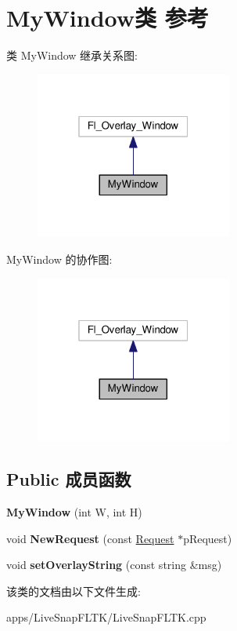 \hypertarget{class_my_window}{\section{My\+Window类 参考}
\label{class_my_window}
}


类 My\+Window 继承关系图\+:
\nopagebreak
\begin{figure}[H]
\begin{center}
\leavevmode
\includegraphics[width=184pt]{class_my_window__inherit__graph}
\end{center}
\end{figure}


My\+Window 的协作图\+:
\nopagebreak
\begin{figure}[H]
\begin{center}
\leavevmode
\includegraphics[width=184pt]{class_my_window__coll__graph}
\end{center}
\end{figure}
\subsection*{Public 成员函数}
\begin{DoxyCompactItemize}
\item 
\hypertarget{class_my_window_af4b59440a4d2df2c39d06c060c13b8ec}{{\bfseries My\+Window} (int W, int H)}\label{class_my_window_af4b59440a4d2df2c39d06c060c13b8ec}

\item 
\hypertarget{class_my_window_a23ed2568039530730f4863106d096101}{void {\bfseries New\+Request} (const \hyperlink{classmv_i_m_p_a_c_t_1_1acquire_1_1_request}{Request} $\ast$p\+Request)}\label{class_my_window_a23ed2568039530730f4863106d096101}

\item 
\hypertarget{class_my_window_a8f3bb4d6875d737c14c4be63b1cc6537}{void {\bfseries set\+Overlay\+String} (const string \&msg)}\label{class_my_window_a8f3bb4d6875d737c14c4be63b1cc6537}

\end{DoxyCompactItemize}


该类的文档由以下文件生成\+:\begin{DoxyCompactItemize}
\item 
apps/\+Live\+Snap\+F\+L\+T\+K/Live\+Snap\+F\+L\+T\+K.\+cpp\end{DoxyCompactItemize}
